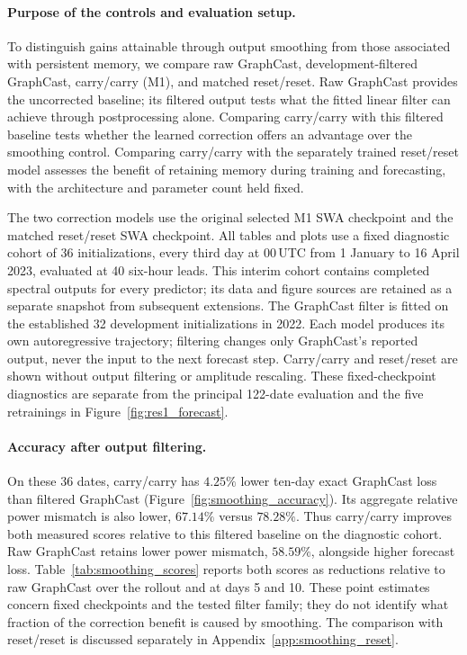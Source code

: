 \documentclass{article}
\newcommand{\vfourred}[1]{{\color{red}#1}}
\begin{document}
\paragraph{\vfourred{Purpose of the controls and evaluation setup.}}
\vfourred{To distinguish gains attainable through output smoothing from those associated with persistent memory, we compare raw GraphCast, development-filtered GraphCast, carry/carry (M1), and matched reset/reset. Raw GraphCast provides the uncorrected baseline; its filtered output tests what the fitted linear filter can achieve through postprocessing alone. Comparing carry/carry with this filtered baseline tests whether the learned correction offers an advantage over the smoothing control. Comparing carry/carry with the separately trained reset/reset model assesses the benefit of retaining memory during training and forecasting, with the architecture and parameter count held fixed.}

\vfourred{The two correction models use the original selected M1 SWA checkpoint and the matched reset/reset SWA checkpoint. All tables and plots use a fixed diagnostic cohort of 36 initializations, every third day at 00\,UTC from 1 January to 16 April 2023, evaluated at 40 six-hour leads. This interim cohort contains completed spectral outputs for every predictor; its data and figure sources are retained as a separate snapshot from subsequent extensions. The GraphCast filter is fitted on the established 32 development initializations in 2022. Each model produces its own autoregressive trajectory; filtering changes only GraphCast's reported output, never the input to the next forecast step. Carry/carry and reset/reset are shown without output filtering or amplitude rescaling. These fixed-checkpoint diagnostics are separate from the principal 122-date evaluation and the five retrainings in Figure~\ref{fig:res1_forecast}.}

\paragraph{\vfourred{Accuracy after output filtering.}}
\vfourred{On these 36 dates, carry/carry has $4.25\%$ lower ten-day exact GraphCast loss than filtered GraphCast (Figure~\ref{fig:smoothing_accuracy}). Its aggregate relative power mismatch is also lower, $67.14\%$ versus $78.28\%$. Thus carry/carry improves both measured scores relative to this filtered baseline on the diagnostic cohort. Raw GraphCast retains lower power mismatch, $58.59\%$, alongside higher forecast loss. Table~\ref{tab:smoothing_scores} reports both scores as reductions relative to raw GraphCast over the rollout and at days 5 and 10. These point estimates concern fixed checkpoints and the tested filter family; they do not identify what fraction of the correction benefit is caused by smoothing. The comparison with reset/reset is discussed separately in Appendix~\ref{app:smoothing_reset}.}
\end{document}
